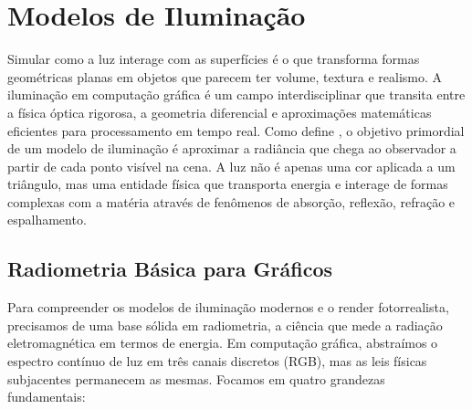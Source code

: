 \chapter{Modelos de Iluminação}

Simular como a luz interage com as superfícies é o que transforma formas geométricas planas em objetos que parecem ter volume, textura e realismo. A iluminação em computação gráfica é um campo interdisciplinar que transita entre a física óptica rigorosa, a geometria diferencial e aproximações matemáticas eficientes para processamento em tempo real. Como define \textcite{shirley2021fundamentals}, o objetivo primordial de um modelo de iluminação é aproximar a radiância que chega ao observador a partir de cada ponto visível na cena. A luz não é apenas uma cor aplicada a um triângulo, mas uma entidade física que transporta energia e interage de formas complexas com a matéria através de fenômenos de absorção, reflexão, refração e espalhamento.

\section{Radiometria Básica para Gráficos}

Para compreender os modelos de iluminação modernos e o render fotorrealista, precisamos de uma base sólida em radiometria, a ciência que mede a radiação eletromagnética em termos de energia. Em computação gráfica, abstraímos o espectro contínuo de luz em três canais discretos (RGB), mas as leis físicas subjacentes permanecem as mesmas. Focamos em quatro grandezas fundamentais:

